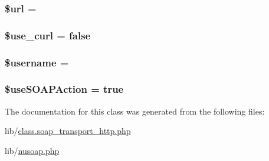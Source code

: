 \subsubsection[{\$url}]{\setlength{\rightskip}{0pt plus 5cm}\$url = \textquotesingle{}\textquotesingle{}}\label{classsoap__transport__http_acf215f34a917d014776ce684a9ee8909}
\hypertarget{classsoap__transport__http_a372c0672391a16e4902e172ea3a0ae63}{}
\subsubsection[{\$use\+\_\+curl}]{\setlength{\rightskip}{0pt plus 5cm}\$use\+\_\+curl = false}\label{classsoap__transport__http_a372c0672391a16e4902e172ea3a0ae63}
\hypertarget{classsoap__transport__http_a0eb82aa5f81cf845de4b36cd653c42cf}{}
\subsubsection[{\$username}]{\setlength{\rightskip}{0pt plus 5cm}\$username = \textquotesingle{}\textquotesingle{}}\label{classsoap__transport__http_a0eb82aa5f81cf845de4b36cd653c42cf}
\hypertarget{classsoap__transport__http_aa1836768f0ac363c44504f84fa890fe0}{}
\subsubsection[{\$use\+S\+O\+A\+P\+Action}]{\setlength{\rightskip}{0pt plus 5cm}\$use\+S\+O\+A\+P\+Action = true}\label{classsoap__transport__http_aa1836768f0ac363c44504f84fa890fe0}


The documentation for this class was generated from the following files\+:\begin{DoxyCompactItemize}
\item 
lib/\hyperlink{class_8soap__transport__http_8php}{class.\+soap\+\_\+transport\+\_\+http.\+php}\item 
lib/\hyperlink{nusoap_8php}{nusoap.\+php}\end{DoxyCompactItemize}
